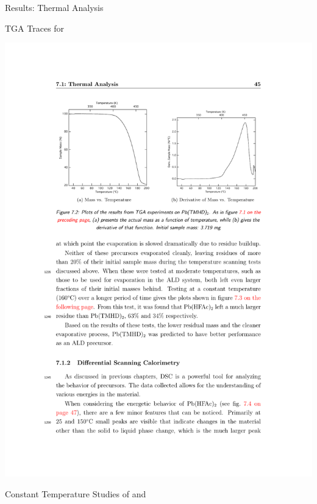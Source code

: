\documentclass[professionalfont]{beamer}
\begin{document}
\begin{frame}{Results: Thermal Analysis}
\begin{overprint}
\begin{center}
		\end{center}
		\begin{center}
		TGA Traces for \\
		\vspace{0.5cm}
		\centerline{\includegraphics[width=\textwidth]{./graphics/data/tga/tmhd}}
		\end{center}
		\begin{center}
		Constant Temperature Studies of  and \\
		\vspace{0.5cm}

\end{center}
\end{overprint}
\end{frame}
\end{document}
